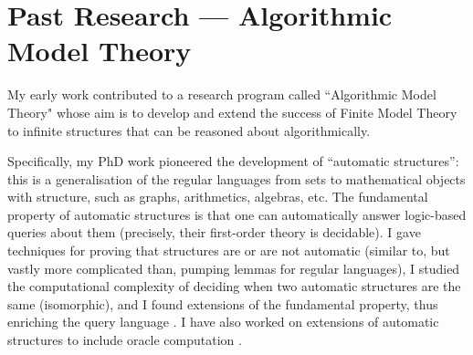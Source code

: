 \documentclass[10pt,a4paper,sans]{moderncv}
\begin{document}




\section{Past Research --- Algorithmic Model Theory}
My early work contributed to a research program called ``Algorithmic  Model Theory" whose aim is to develop and extend the success of Finite Model Theory to infinite structures that can be reasoned about algorithmically. 
\newline

Specifically, my PhD work pioneered the development of ``automatic structures'': this is a generalisation of the regular languages from sets to mathematical objects with structure, such as graphs, arithmetics, algebras, etc.  The fundamental property of automatic structures is that one can automatically answer logic-based queries about them (precisely, their first-order theory is decidable). I gave techniques for proving that structures are or are not automatic (similar to, but vastly more complicated than, pumping lemmas for regular languages), I studied the computational complexity of deciding when two automatic structures are the same (isomorphic), and I found extensions of the fundamental property, thus enriching the query language \cite{BGR11,DBLP:conf/lics/IshiharaKR02,DBLP:conf/lics/KhoussainovNRS04,DBLP:journals/lmcs/KhoussainovNRS07,DBLP:conf/lics/KhoussainovRS03,DBLP:conf/stacs/KhoussainovRS04,DBLP:journals/tocl/KhoussainovRS05,DBLP:journals/bsl/Rubin08}. I have also worked on extensions of automatic structures to include oracle computation \cite{DBLP:journals/corr/abs-1210-2462,DBLP:conf/lics/RabinovichR12}.
\newline


% 
% 
\end{document}
